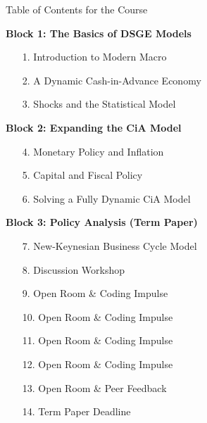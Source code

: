 \documentclass[10pt,c,aspectratio=1610,handout]{beamer}
\begin{document}
\begin{frame}[c]{Table of Contents for the Course}%
  \begin{minipage}{0.475\textwidth}%
    \textbf{Block 1: The Basics of DSGE Models}%
    \vspace{0.1in}%
    \begin{enumerate}%
      \item[1.] Introduction to Modern Macro%
      \item[2.] A Dynamic Cash-in-Advance Economy%
      \item[3.] Shocks and the Statistical Model%
    \end{enumerate}%
    \vspace*{0.1in}%
    \pause%
    \textbf{Block 2: Expanding the CiA Model}%
    \vspace*{0.1in}%
    \begin{enumerate}
      \item[4.] Monetary Policy and Inflation%
      \item[5.] Capital and Fiscal Policy%
      \item[6.] Solving a Fully Dynamic CiA Model%
    \end{enumerate}
  \end{minipage}%
  \hfill%
  \pause%
  \begin{minipage}{0.475\textwidth}%
    \textbf{Block 3: Policy Analysis (Term Paper)}%
    \vspace{0.1in}%
    \begin{enumerate}%
      \item[7.] New-Keynesian Business Cycle Model%
      \item[8.] Discussion Workshop%
      \item[9.] Open Room \& Coding Impulse%
      \item[10.] Open Room \& Coding Impulse%
      \item[11.] Open Room \& Coding Impulse%
      \item[12.] Open Room \& Coding Impulse%
      \item[13.] Open Room \& Peer Feedback%
      \item[14.] Term Paper Deadline%
    \end{enumerate}%
  \end{minipage}%
\end{frame}%
\end{document}
